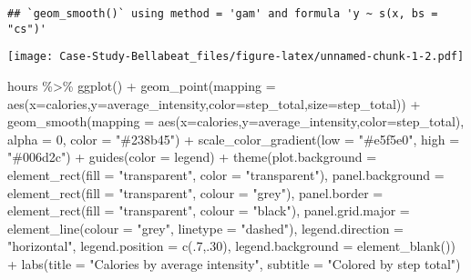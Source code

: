 \documentclass[
]{article}
\newenvironment{Shaded}{\begin{snugshade}}{\end{snugshade}}
\newcommand{\AttributeTok}[1]{\textcolor[rgb]{0.77,0.63,0.00}{#1}}
\newcommand{\DecValTok}[1]{\textcolor[rgb]{0.00,0.00,0.81}{#1}}
\newcommand{\FunctionTok}[1]{\textcolor[rgb]{0.00,0.00,0.00}{#1}}
\newcommand{\NormalTok}[1]{#1}
\newcommand{\SpecialCharTok}[1]{\textcolor[rgb]{0.00,0.00,0.00}{#1}}
\newcommand{\StringTok}[1]{\textcolor[rgb]{0.31,0.60,0.02}{#1}}
\begin{document}
\begin{verbatim}
## `geom_smooth()` using method = 'gam' and formula 'y ~ s(x, bs = "cs")'
\end{verbatim}

\texttt{[image: Case-Study-Bellabeat\_files/figure-latex/unnamed-chunk-1-2.pdf]}

\begin{Shaded}
\begin{Highlighting}[]
\NormalTok{hours }\SpecialCharTok{\%\textgreater{}\%}
  \FunctionTok{ggplot}\NormalTok{() }\SpecialCharTok{+} 
  \FunctionTok{geom\_point}\NormalTok{(}\AttributeTok{mapping =} \FunctionTok{aes}\NormalTok{(}\AttributeTok{x=}\NormalTok{calories,}\AttributeTok{y=}\NormalTok{average\_intensity,}\AttributeTok{color=}\NormalTok{step\_total,}\AttributeTok{size=}\NormalTok{step\_total)) }\SpecialCharTok{+} 
  \FunctionTok{geom\_smooth}\NormalTok{(}\AttributeTok{mapping =} \FunctionTok{aes}\NormalTok{(}\AttributeTok{x=}\NormalTok{calories,}\AttributeTok{y=}\NormalTok{average\_intensity,}\AttributeTok{color=}\NormalTok{step\_total), }\AttributeTok{alpha =} \DecValTok{0}\NormalTok{, }\AttributeTok{color =} \StringTok{"\#238b45"}\NormalTok{) }\SpecialCharTok{+} 
  \FunctionTok{scale\_color\_gradient}\NormalTok{(}\AttributeTok{low =} \StringTok{"\#e5f5e0"}\NormalTok{, }\AttributeTok{high =} \StringTok{"\#006d2c"}\NormalTok{) }\SpecialCharTok{+}
  \FunctionTok{guides}\NormalTok{(}\AttributeTok{color =} \StringTok{\textquotesingle{}legend\textquotesingle{}}\NormalTok{) }\SpecialCharTok{+}
  \FunctionTok{theme}\NormalTok{(}\AttributeTok{plot.background =} \FunctionTok{element\_rect}\NormalTok{(}\AttributeTok{fill =} \StringTok{"transparent"}\NormalTok{, }\AttributeTok{color =} \StringTok{"transparent"}\NormalTok{),}
        \AttributeTok{panel.background =} \FunctionTok{element\_rect}\NormalTok{(}\AttributeTok{fill =} \StringTok{"transparent"}\NormalTok{, }\AttributeTok{colour =} \StringTok{"grey"}\NormalTok{),}
        \AttributeTok{panel.border =} \FunctionTok{element\_rect}\NormalTok{(}\AttributeTok{fill =} \StringTok{"transparent"}\NormalTok{, }\AttributeTok{colour =} \StringTok{"black"}\NormalTok{),}
        \AttributeTok{panel.grid.major =} \FunctionTok{element\_line}\NormalTok{(}\AttributeTok{colour =} \StringTok{"grey"}\NormalTok{, }\AttributeTok{linetype =} \StringTok{"dashed"}\NormalTok{),}
        \AttributeTok{legend.direction =} \StringTok{"horizontal"}\NormalTok{,}
        \AttributeTok{legend.position =} \FunctionTok{c}\NormalTok{(.}\DecValTok{7}\NormalTok{,.}\DecValTok{30}\NormalTok{), }
        \AttributeTok{legend.background =} \FunctionTok{element\_blank}\NormalTok{()) }\SpecialCharTok{+}
  \FunctionTok{labs}\NormalTok{(}\AttributeTok{title =} \StringTok{"Calories by average intensity"}\NormalTok{, }\AttributeTok{subtitle =} \StringTok{"Colored by step total"}\NormalTok{)}
\end{Highlighting}
\end{Shaded}
\end{document}
